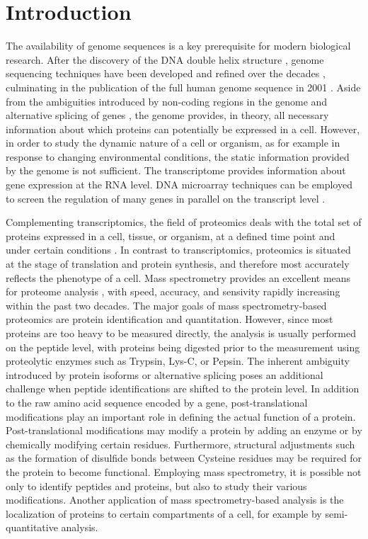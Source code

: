 \chapter{Introduction}

The availability of genome sequences is a key prerequisite for modern 
biological research.
After the discovery of the DNA double helix structure \citep{Watson1953},
genome sequencing techniques have been developed and refined over the decades
\citep{Gilbert1973, Sanger1975}, 
culminating in the publication of the full human genome sequence in 2001 
\citep{Venter2001}.
Aside from the ambiguities introduced by non-coding regions in the genome 
\citep{Gilbert1978} and alternative splicing of genes \citep{Black2003}, 
the genome provides, in theory, all necessary information about which proteins 
can potentially be expressed in a cell.
However, in order to study the dynamic nature of a cell or organism, as for 
example in response to changing environmental conditions, the static information
provided by the genome is not sufficient. 
The transcriptome provides information about gene expression at the RNA level. 
DNA microarray techniques can be employed to screen the regulation of many
genes in parallel on the transcript level \citep{Schena1995}.

Complementing transcriptomics, the field of proteomics deals with the total
set of proteins expressed in a cell, tissue, or organism, at a defined time
point and under certain conditions \citep{Yarmush2002, Yates2009}.
In contrast to transcriptomics, proteomics is situated at the stage of 
translation and protein synthesis, and therefore most accurately reflects the 
phenotype of a cell. 
Mass spectrometry provides an excellent means for proteome analysis
\citep{Aebersold2003}, with speed, accuracy, and sensivity rapidly increasing
within the past two decades.
The major goals of mass spectrometry-based proteomics are protein 
identification and quantitation.
However, since most proteins are too heavy to be measured directly, the
analysis is usually performed on the peptide level, with proteins being digested
prior to the measurement using proteolytic enzymes such as Trypsin, Lys-C, or 
Pepsin. 
The inherent ambiguity introduced by protein isoforms or alternative splicing
poses an additional challenge when peptide identifications are shifted to
the protein level.
In addition to the raw amino acid sequence encoded by a gene, post-translational
modifications play an important role in defining the actual function of a
protein.
Post-translational modifications may modify a protein by adding an enzyme or by
chemically modifying certain residues.
Furthermore, structural adjustments such as the formation of disulfide 
bonds between Cysteine residues may be required for the protein to become 
functional.
Employing mass spectrometry, it is possible not only to identify peptides and
proteins, but also to study their various modifications.
Another application of mass spectrometry-based analysis is the localization of
proteins to certain compartments of a cell, for example by semi-quantitative
analysis.

